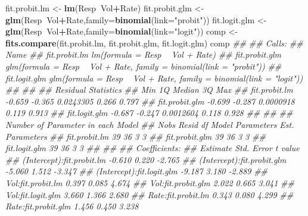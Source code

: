 \documentclass[
]{article}
\newenvironment{Shaded}{\begin{snugshade}}{\end{snugshade}}
\newcommand{\CommentTok}[1]{\textcolor[rgb]{0.56,0.35,0.01}{\textit{#1}}}
\newcommand{\DataTypeTok}[1]{\textcolor[rgb]{0.13,0.29,0.53}{#1}}
\newcommand{\KeywordTok}[1]{\textcolor[rgb]{0.13,0.29,0.53}{\textbf{#1}}}
\newcommand{\NormalTok}[1]{#1}
\newcommand{\OperatorTok}[1]{\textcolor[rgb]{0.81,0.36,0.00}{\textbf{#1}}}
\newcommand{\StringTok}[1]{\textcolor[rgb]{0.31,0.60,0.02}{#1}}
\begin{document}
\begin{Shaded}
\begin{Highlighting}[]
\NormalTok{fit.probit.lm <-}\StringTok{ }\KeywordTok{lm}\NormalTok{(Resp}\OperatorTok{~}\NormalTok{Vol}\OperatorTok{+}\NormalTok{Rate)}
\NormalTok{fit.probit.glm <-}\StringTok{ }\KeywordTok{glm}\NormalTok{(Resp}\OperatorTok{~}\NormalTok{Vol}\OperatorTok{+}\NormalTok{Rate,}\DataTypeTok{family=}\KeywordTok{binomial}\NormalTok{(}\DataTypeTok{link=}\StringTok{"probit"}\NormalTok{))}
\NormalTok{fit.logit.glm <-}\StringTok{ }\KeywordTok{glm}\NormalTok{(Resp}\OperatorTok{~}\NormalTok{Vol}\OperatorTok{+}\NormalTok{Rate,}\DataTypeTok{family=}\KeywordTok{binomial}\NormalTok{(}\DataTypeTok{link=}\StringTok{"logit"}\NormalTok{))}
\NormalTok{comp <-}\StringTok{ }\KeywordTok{fits.compare}\NormalTok{(fit.probit.lm, fit.probit.glm, fit.logit.glm)}
\NormalTok{comp}
\CommentTok{## }
\CommentTok{## Calls: }
\CommentTok{## Name}
\CommentTok{## fit.probit.lm     lm(formula = Resp ~ Vol + Rate)}
\CommentTok{## fit.probit.glm    glm(formula = Resp ~ Vol + Rate, family = binomial(link = "probit"))}
\CommentTok{## fit.logit.glm     glm(formula = Resp ~ Vol + Rate, family = binomial(link = "logit"))}
\CommentTok{## }
\CommentTok{## }
\CommentTok{## Residual Statistics}
\CommentTok{##                   Min     1Q    Median    3Q   Max}
\CommentTok{## fit.probit.lm  -0.659 -0.365 0.0243305 0.266 0.797}
\CommentTok{## fit.probit.glm -0.699 -0.287 0.0000918 0.119 0.913}
\CommentTok{## fit.logit.glm  -0.687 -0.247 0.0012604 0.118 0.928}
\CommentTok{## }
\CommentTok{## }
\CommentTok{## Number of Parameter in each Model}
\CommentTok{##                Nobs Resid df Model Parameters Est. Parameters}
\CommentTok{## fit.probit.lm    39       36                3               3}
\CommentTok{## fit.probit.glm   39       36                3               3}
\CommentTok{## fit.logit.glm    39       36                3               3}
\CommentTok{## }
\CommentTok{## }
\CommentTok{## Coefficients:}
\CommentTok{##                            Estimate Std. Error t value}
\CommentTok{## (Intercept):fit.probit.lm  -0.610    0.220     -2.765 }
\CommentTok{## (Intercept):fit.probit.glm -5.060    1.512     -3.347 }
\CommentTok{## (Intercept):fit.logit.glm  -9.187    3.180     -2.889 }
\CommentTok{## Vol:fit.probit.lm           0.397    0.085      4.674 }
\CommentTok{## Vol:fit.probit.glm          2.022    0.665      3.041 }
\CommentTok{## Vol:fit.logit.glm           3.660    1.366      2.680 }
\CommentTok{## Rate:fit.probit.lm          0.343    0.080      4.299 }
\CommentTok{## Rate:fit.probit.glm         1.456    0.450      3.238 }

\end{Highlighting}
\end{Shaded}
\end{document}
